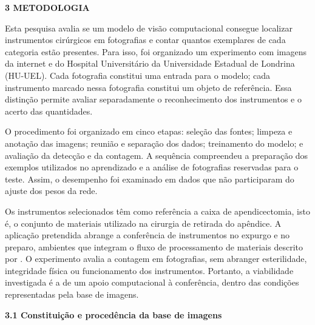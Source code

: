 \begingroup
\justifying
\setlength{\parindent}{1.25cm}
\setlength{\parskip}{0pt}
\setlength{\emergencystretch}{2em}
\onehalfspacing

{}
\noindent\textbf{3 METODOLOGIA}\par
\nobreak\vspace{\baselineskip}\nobreak

Esta pesquisa avalia se um modelo de visão computacional consegue localizar instrumentos cirúrgicos em fotografias e contar quantos exemplares de cada categoria estão presentes. Para isso, foi organizado um experimento com imagens da internet e do Hospital Universitário da Universidade Estadual de Londrina (HU-UEL). Cada fotografia constitui uma entrada para o modelo; cada instrumento marcado nessa fotografia constitui um objeto de referência. Essa distinção permite avaliar separadamente o reconhecimento dos instrumentos e o acerto das quantidades.

O procedimento foi organizado em cinco etapas: seleção das fontes; limpeza e anotação das imagens; reunião e separação dos dados; treinamento do modelo; e avaliação da detecção e da contagem. A sequência compreendeu a preparação dos exemplos utilizados no aprendizado e a análise de fotografias reservadas para o teste. Assim, o desempenho foi examinado em dados que não participaram do ajuste dos pesos da rede.

Os instrumentos selecionados têm como referência a caixa de apendicectomia, isto é, o conjunto de materiais utilizado na cirurgia de retirada do apêndice. A aplicação pretendida abrange a conferência de instrumentos no expurgo e no preparo, ambientes que integram o fluxo de processamento de materiais descrito por \textcite{moreto2025}. O experimento avalia a contagem em fotografias, sem abranger esterilidade, integridade física ou funcionamento dos instrumentos. Portanto, a viabilidade investigada é a de um apoio computacional à conferência, dentro das condições representadas pela base de imagens.

\vspace{\baselineskip}
{}
\noindent\textbf{3.1 Constituição e procedência da base de imagens}\par
\nobreak\vspace{\baselineskip}\nobreak

